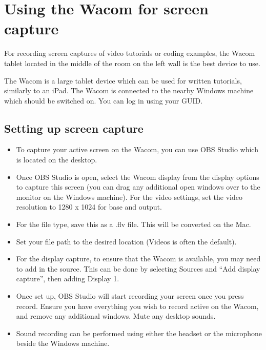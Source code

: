 \documentclass[
]{book}
\begin{document}
\hypertarget{using-the-wacom-for-screen-capture}{%
\chapter{Using the Wacom for screen capture}\label{using-the-wacom-for-screen-capture}}

For recording screen captures of video tutorials or coding examples, the Wacom tablet located in the middle of the room on the left wall is the best device to use.

The Wacom is a large tablet device which can be used for written tutorials, similarly to an iPad. The Wacom is connected to the nearby Windows machine which should be switched on. You can log in using your GUID.

\hypertarget{setting-up-screen-capture}{%
\section{Setting up screen capture}\label{setting-up-screen-capture}}

\begin{itemize}
\item
  To capture your active screen on the Wacom, you can use OBS Studio which is located on the desktop.
\item
  Once OBS Studio is open, select the Wacom display from the display options to capture this screen (you can drag any additional open windows over to the monitor on the Windows machine). For the video settings, set the video resolution to 1280 x 1024 for base and output.
\item
  For the file type, save this as a .flv file. This will be converted on the Mac.
\item
  Set your file path to the desired location (Videos is often the default).
\item
  For the display capture, to ensure that the Wacom is available, you may need to add in the source. This can be done by selecting Sources and ``Add display capture'', then adding Display 1.
\item
  Once set up, OBS Studio will start recording your screen once you press record. Ensure you have everything you wish to record active on the Wacom, and remove any additional windows. Mute any desktop sounds.
\item
  Sound recording can be performed using either the headset or the microphone beside the Windows machine.
\end{itemize}
\end{document}
